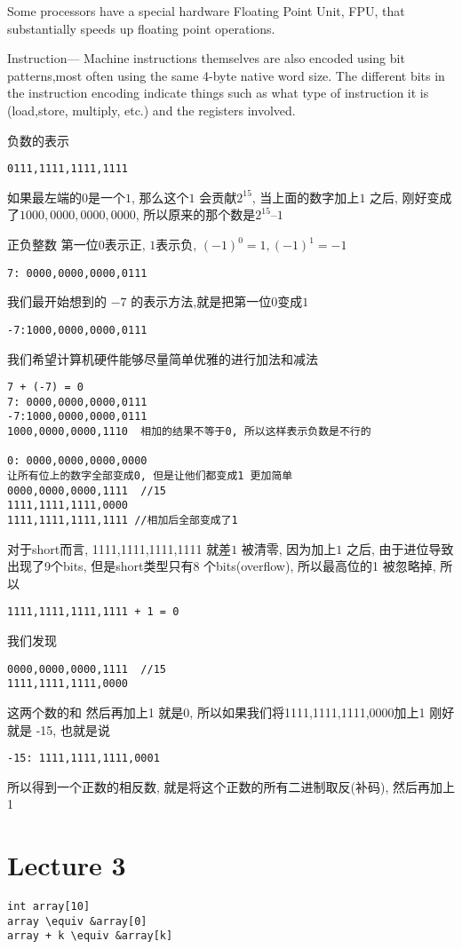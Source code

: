 \documentclass{article}
\begin{document}
Some processors have a special hardware Floating Point Unit, FPU, that substantially speeds up floating point operations.

Instruction— Machine instructions themselves are also encoded using bit patterns,most often using the same 4-byte native word size. The different bits in the instruction encoding indicate things such as what type of instruction it is (load,store, multiply, etc.) and the registers involved.

负数的表示
\begin{verbatim}
0111,1111,1111,1111
\end{verbatim}
如果最左端的$0$是一个$1$, 那么这个$1$ 会贡献$2^{15}$, 当上面的数字加上$1$ 之后, 刚好变成了$1000,0000,0000,0000$, 所以原来的那个数是$2^{15} – 1$

正负整数
第一位$0$表示正, $1$表示负, $(-1)^0=1, (-1)^1 = -1$
\begin{verbatim}
7: 0000,0000,0000,0111
\end{verbatim}
我们最开始想到的 $-7$ 的表示方法,就是把第一位$0$变成$1$
\begin{verbatim}
-7:1000,0000,0000,0111
\end{verbatim}

我们希望计算机硬件能够尽量简单优雅的进行加法和减法
\begin{verbatim}
7 + (-7) = 0
7: 0000,0000,0000,0111
-7:1000,0000,0000,0111
1000,0000,0000,1110  相加的结果不等于0, 所以这样表示负数是不行的

0: 0000,0000,0000,0000
让所有位上的数字全部变成0, 但是让他们都变成1 更加简单
0000,0000,0000,1111  //15
1111,1111,1111,0000
1111,1111,1111,1111 //相加后全部变成了1
\end{verbatim}
对于short而言, 1111,1111,1111,1111 就差$1$ 被清零, 因为加上$1$ 之后, 由于进位导致出现了9个bits, 但是short类型只有8 个bits(overflow), 所以最高位的1 被忽略掉, 所以
\begin{verbatim}
1111,1111,1111,1111 + 1 = 0
\end{verbatim}
我们发现
\begin{verbatim}
0000,0000,0000,1111  //15
1111,1111,1111,0000
\end{verbatim}
这两个数的和 然后再加上1 就是0, 所以如果我们将1111,1111,1111,0000加上1 刚好就是 -15, 也就是说
\begin{verbatim}
-15: 1111,1111,1111,0001
\end{verbatim}
所以得到一个正数的相反数, 就是将这个正数的所有二进制取反(补码), 然后再加上1

\section{Lecture 3}
\begin{verbatim}
int array[10]
array \equiv &array[0]
array + k \equiv &array[k]
\end{verbatim}
\end{document}
